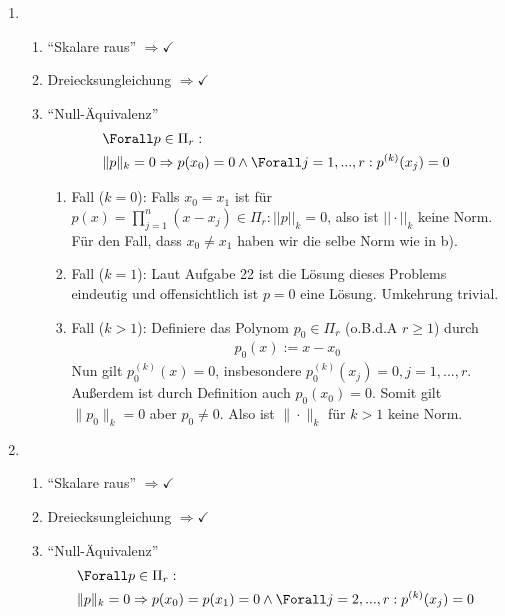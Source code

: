 \begin{solution}
\begin{enumerate}[label = \textbf{\alph*)}]
  \item
  \begin{enumerate}[label = \textit{\roman*)}]
    \item \enquote{Skalare raus} $\Rightarrow \checkmark$
    \item Dreiecksungleichung $\Rightarrow \checkmark$
    \item \enquote{Null-Äquivalenz} \begin{align*}
      &\Forall p \in \Pi_r: \\
      & \|p\|_k = 0 \Rightarrow p(x_0) = 0 \land \Forall j=1,...,r: p^{(k)}(x_j) = 0
    \end{align*}
    \begin{enumerate}[label = \textit{\arabic*.}]
      \item Fall ($k = 0$):
      Falls $x_0 = x_1$ ist für $p(x) = \prod_{j=1}^n (x - x_j) \in \Pi_r: ||p||_k = 0$,
      also ist $||\cdot||_k$ keine Norm. \\
      Für den Fall, dass $x_0 \neq x_1$ haben wir die selbe Norm wie in b).
      \item Fall ($k=1$):
      Laut Aufgabe 22 ist die Lösung dieses Problems eindeutig und offensichtlich ist $p = 0$ eine Lösung.
      Umkehrung trivial.
      \item Fall ($k>1$):
      Definiere das Polynom $p_0 \in \Pi_r$ (o.B.d.A $r \geq 1$) durch
      \begin{align*}
        p_0(x) := x-x_0
      \end{align*}
      Nun gilt $p_0^{(k)}(x) = 0$, insbesondere $p_0^{(k)}(x_j) = 0, j=1,...,r$. Außerdem ist durch Definition auch $p_0(x_0) = 0$.
      Somit gilt $\|p_0\|_k = 0$ aber $p_0 \neq 0$. Also ist $\|\cdot\|_k$ für $k>1$ keine Norm.
    \end{enumerate}
  \end{enumerate}
  \item
  \begin{enumerate}[label = \textit{\roman*)}]
    \item \enquote{Skalare raus} $\Rightarrow \checkmark$
    \item Dreiecksungleichung $\Rightarrow \checkmark$
    \item \enquote{Null-Äquivalenz} \begin{align*}
      &\Forall p \in \Pi_r: \\
      & \|p\|_k = 0 \Rightarrow p(x_0) = p(x_1) = 0 \land \Forall j=2,...,r: p^{(k)}(x_j) = 0
    \end{align*}
    \begin{enumerate}[label = \textit{\arabic*.}]

\end{enumerate}
\end{enumerate}
\end{enumerate}
\end{solution}

